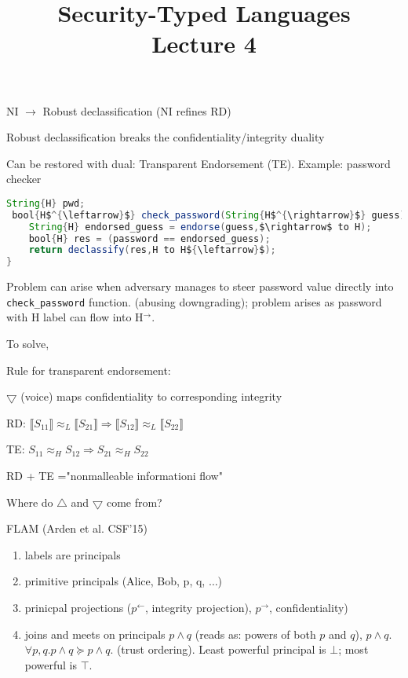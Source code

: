 \documentclass{article}
\title{Security-Typed Languages \\ \Large{Lecture 4}}
\begin{document}
\maketitle

NI $\rightarrow$ Robust declassification (NI refines RD)

Robust declassification breaks the confidentiality/integrity duality

Can be restored with dual: Transparent Endorsement (TE).
Example: password checker
\begin{lstlisting}[mathescape,frame=single,basicstyle=\ttfamily,language=java]
String{H} pwd;
 bool{H$^{\leftarrow}$} check_password(String{H$^{\rightarrow}$} guess) {
    String{H} endorsed_guess = endorse(guess,$\rightarrow$ to H);
    bool{H} res = (password == endorsed_guess);
    return declassify(res,H to H${\leftarrow}$);
}
\end{lstlisting}
Problem can arise when adversary manages to steer password value directly into \texttt{check\_password} function. (abusing downgrading); problem arises as password with H label can flow into H$^{\rightarrow}$. 

To solve,

Rule for transparent endorsement:
\begin{prooftree}
\end{prooftree}

$\bigtriangledown$ (voice) maps confidentiality to corresponding integrity

RD: $\llbracket S_{11} \rrbracket \approx_L \llbracket S_{21} \rrbracket \Rightarrow \llbracket S_{12} \rrbracket \approx_L \llbracket S_{22} \rrbracket $

TE: $S_{11} \approx_H S_{12} \Rightarrow S_{21} \approx_H S_{22} $

RD + TE ="nonmalleable informationi flow"

Where do $\bigtriangleup$ and $\bigtriangledown$ come from?

FLAM (Arden et al. CSF'15)

\begin{enumerate}
    \item labels are principals
    \item primitive principals (Alice, Bob, p, q, $\ldots$)
    \item prinicpal projections ($p^{\leftarrow}$, integrity projection), $p^{\rightarrow}$, confidentiality)
    \item joins and meets on principals $p \land q$ (reads as: powers of both $p$ and $q$), $p \wedge q$. $\forall p,q. p \land q \succeq p \wedge q$. (trust ordering). Least powerful principal is $\bot$; most powerful is $\top$. %
\end{enumerate}
\end{document}
